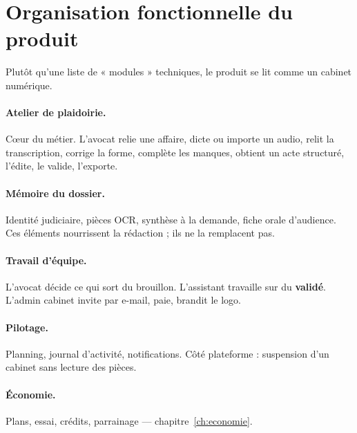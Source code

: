 \section{Organisation fonctionnelle du produit}

Plutôt qu'une liste de « modules » techniques, le produit se lit comme un cabinet numérique.

\paragraph{Atelier de plaidoirie.}
Cœur du métier. L'avocat relie une affaire, dicte ou importe un audio, relit la transcription, corrige la forme, complète les manques, obtient un acte structuré, l'édite, le valide, l'exporte.

\paragraph{Mémoire du dossier.}
Identité judiciaire, pièces OCR, synthèse à la demande, fiche orale d'audience. Ces éléments nourrissent la rédaction ; ils ne la remplacent pas.

\paragraph{Travail d'équipe.}
L'avocat décide ce qui sort du brouillon. L'assistant travaille sur du \textbf{validé}. L'admin cabinet invite par e-mail, paie, brandit le logo.

\paragraph{Pilotage.}
Planning, journal d'activité, notifications. Côté plateforme : suspension d'un cabinet sans lecture des pièces.

\paragraph{Économie.}
Plans, essai, crédits, parrainage --- chapitre~\ref{ch:economie}.
